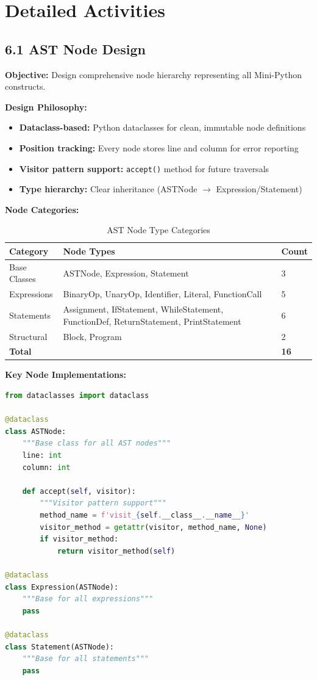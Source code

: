 \documentclass[a4paper,11pt]{article}
\begin{document}
\section{Detailed Activities}

\subsection{6.1 AST Node Design}

\textbf{Objective:} Design comprehensive node hierarchy representing all Mini-Python constructs.

\textbf{Design Philosophy:}
\begin{itemize}[leftmargin=*]
    \item \textbf{Dataclass-based:} Python dataclasses for clean, immutable node definitions
    \item \textbf{Position tracking:} Every node stores line and column for error reporting
    \item \textbf{Visitor pattern support:} \texttt{accept()} method for future traversals
    \item \textbf{Type hierarchy:} Clear inheritance (ASTNode $\rightarrow$ Expression/Statement)
\end{itemize}

\textbf{Node Categories:}

\begin{table}[h]
\centering
\begin{tabularx}{\textwidth}{|l|X|l|}
\hline
\rowcolor{blue!10}
\textbf{Category} & \textbf{Node Types} & \textbf{Count} \\
\hline
Base Classes & ASTNode, Expression, Statement & 3 \\
\hline
Expressions & BinaryOp, UnaryOp, Identifier, Literal, FunctionCall & 5 \\
\hline
Statements & Assignment, IfStatement, WhileStatement, FunctionDef, ReturnStatement, PrintStatement & 6 \\
\hline
Structural & Block, Program & 2 \\
\hline
\textbf{Total} & & \textbf{16} \\
\hline
\end{tabularx}
\caption{AST Node Type Categories}
\end{table}

\textbf{Key Node Implementations:}

\begin{lstlisting}[language=Python, caption=AST Base Classes]
from dataclasses import dataclass

@dataclass
class ASTNode:
    """Base class for all AST nodes"""
    line: int
    column: int
    
    def accept(self, visitor):
        """Visitor pattern support"""
        method_name = f'visit_{self.__class__.__name__}'
        visitor_method = getattr(visitor, method_name, None)
        if visitor_method:
            return visitor_method(self)

@dataclass
class Expression(ASTNode):
    """Base for all expressions"""
    pass

@dataclass
class Statement(ASTNode):
    """Base for all statements"""
    pass
\end{lstlisting}
\end{document}
